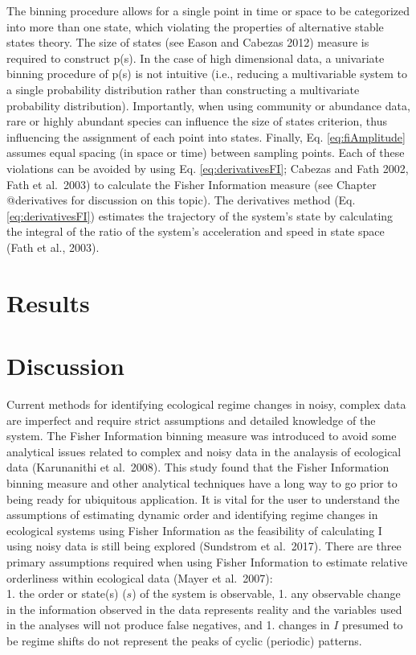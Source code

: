 \documentclass[12pt,twoside,openany]{reedthesis}
\begin{document}
The binning procedure allows for a single point in time or space to be categorized into more than one state, which violating the properties of alternative stable states theory. The size of states (see Eason and Cabezas 2012) measure is required to construct p(s). In the case of high dimensional data, a univariate binning procedure of p(s) is not intuitive (i.e., reducing a multivariable system to a single probability distribution rather than constructing a multivariate probability distribution). Importantly, when using community or abundance data, rare or highly abundant species can influence the size of states criterion, thus influencing the assignment of each point into states. Finally, Eq. \eqref{eq:fiAmplitude} assumes equal spacing (in space or time) between sampling points. Each of these violations can be avoided by using Eq. \eqref{eq:derivativesFI}; Cabezas and Fath 2002, Fath et al.~2003) to calculate the Fisher Information measure (see Chapter @derivatives for discussion on this topic). The derivatives method (Eq. \eqref{eq:derivativesFI}) estimates the trajectory of the system's state by calculating the integral of the ratio of the system's acceleration and speed in state space (Fath et al., 2003).

\hypertarget{results-1}{%
\section{Results}\label{results-1}}

\hypertarget{discussion-1}{%
\section{Discussion}\label{discussion-1}}

Current methods for identifying ecological regime changes in noisy, complex data are imperfect and require strict assumptions and detailed knowledge of the system. The Fisher Information binning measure was introduced to avoid some analytical issues related to complex and noisy data in the analaysis of ecological data (Karunanithi et al.~2008). This study found that the Fisher Information binning measure and other analytical techniques have a long way to go prior to being ready for ubiquitous application.
It is vital for the user to understand the assumptions of estimating dynamic order and identifying regime changes in ecological systems using Fisher Information as the feasibility of calculating I using noisy data is still being explored (Sundstrom et al.~2017). There are three primary assumptions required when using Fisher Information to estimate relative orderliness within ecological data (Mayer et al.~2007):\\
1. the order or state(s) (\(s\)) of the system is observable,
1. any observable change in the information observed in the data represents reality and the variables used in the analyses will not produce false negatives, and
1. changes in \(I\) presumed to be regime shifts do not represent the peaks of cyclic (periodic) patterns.
\end{document}
